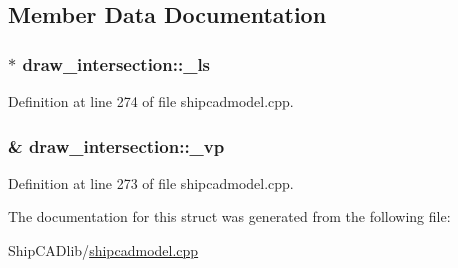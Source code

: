 \subsection{Member Data Documentation}
\hypertarget{structdraw__intersection_a5f59d55f5e41a2585af4fea6a4d93374}{
\subsubsection[{\-\_\-ls}]{$\ast$ draw\-\_\-intersection\-::\-\_\-ls}}\label{structdraw__intersection_a5f59d55f5e41a2585af4fea6a4d93374}


Definition at line 274 of file shipcadmodel.\-cpp.

\hypertarget{structdraw__intersection_a4550bf7c1203e48abdc041e4e248c5f7}{
\subsubsection[{\-\_\-vp}]{\& draw\-\_\-intersection\-::\-\_\-vp}}\label{structdraw__intersection_a4550bf7c1203e48abdc041e4e248c5f7}


Definition at line 273 of file shipcadmodel.\-cpp.



The documentation for this struct was generated from the following file\-:\begin{DoxyCompactItemize}
\item 
Ship\-C\-A\-Dlib/\hyperlink{shipcadmodel_8cpp}{shipcadmodel.\-cpp}\end{DoxyCompactItemize}
